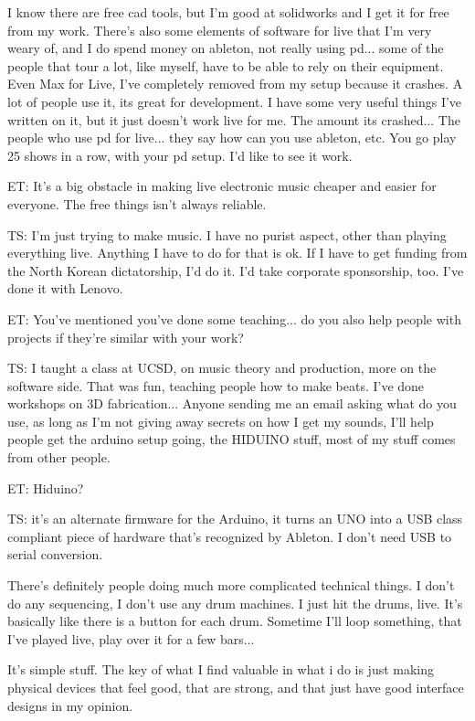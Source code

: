 I know there are free cad tools, but I'm good at solidworks and I get it for free from my work. There's also some elements of software for live that I'm very weary of, and I do spend money on ableton, not really using pd... some of the people that tour a lot, like myself, have to be able to rely on their equipment. Even Max for Live, I've completely removed from my setup because it crashes. A lot of people use it, its great for development. I have some very useful things I've written on it, but it just doesn't work live for me. The amount its crashed... The people who use pd for live... they say how can you use ableton, etc. You go play 25 shows in a row, with your pd setup. I'd like to see it work. 

ET: It's a big obstacle in making live electronic music cheaper and easier for everyone. The free things isn't always reliable.

TS: I'm just trying to make music. I have no purist aspect, other than playing everything live. Anything I have to do for that is ok. If I have to get funding from the North Korean dictatorship, I'd do it. I'd take corporate sponsorship, too. I've done it with Lenovo. 

ET: You've mentioned you've done some teaching... do you also help people with projects if they're similar with your work? 

TS: I taught a class at UCSD, on music theory and production, more on the software side. That was fun, teaching people how to make beats. I've done workshops on 3D fabrication... Anyone sending me an email asking what do you use, as long as I'm not giving away secrets on how I get my sounds, I'll help people get the arduino setup going, the HIDUINO stuff, most of my stuff comes from other people. 

ET: Hiduino? 

TS: it's an alternate firmware for the Arduino, it turns an UNO into a USB class compliant piece of hardware that's recognized by Ableton. I don't need USB to serial conversion. 

There's definitely people doing much more complicated technical things. I don't do any sequencing, I don't use any drum machines. I just hit the drums, live. It's basically like there is a button for each drum. Sometime I'll loop something, that I've played live, play over it for a few bars... 

It's simple stuff. The key of what I find valuable in what i do is just making physical devices that feel good, that are strong, and that just have good interface designs in my opinion. 

